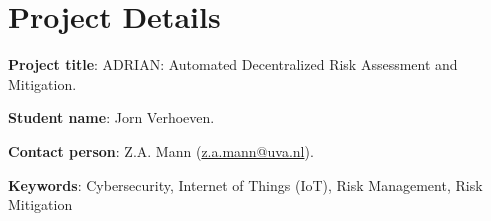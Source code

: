 \section{Project Details}
\hspace{1.15em}
\textbf{Project title}: ADRIAN: Automated Decentralized Risk Assessment and Mitigation.

\textbf{Student name}: Jorn Verhoeven.

\textbf{Contact person}: Z.A. Mann (\href{mailto://z.a.mann@uva.nl}{z.a.mann@uva.nl}).

\textbf{Keywords}: Cybersecurity, Internet of Things (IoT), Risk Management, Risk Mitigation
